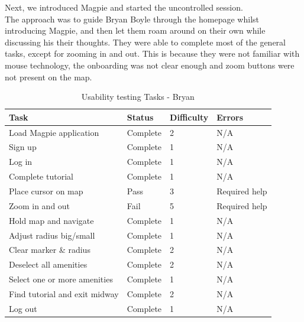 \noindent Next, we introduced Magpie and started the uncontrolled session.\\
The approach was to guide Bryan Boyle through the homepage whilst introducing Magpie, and then let them roam around on their own while discussing his their thoughts. They were able to complete most of the general tasks, except for zooming in and out. This is because they were not familiar with mouse technology, the onboarding was not clear enough and zoom buttons were not present on the map.
\begin{table}[h!]
    \centering
    \caption{Usability testing Tasks - Bryan}
    \begin{tabular}{|p{}|p{}|p{}|p{}|}
        \hline
        \textbf{Task}                 & \textbf{Status} & \textbf{Difficulty} & \textbf{Errors} \\
        \hline
        Load Magpie application       & Complete        & 2                   & N/A             \\
        \hline
        Sign up                       & Complete        & 1                   & N/A             \\
        \hline
        Log in                        & Complete        & 1                   & N/A             \\
        \hline
        Complete tutorial             & Complete        & 1                   & N/A             \\
        \hline
        Place cursor on map           & Pass            & 3                   & Required help   \\
        \hline
        Zoom in and out               & Fail            & 5                   & Required help   \\
        \hline
        Hold map and navigate         & Complete        & 1                   & N/A             \\
        \hline
        Adjust radius big/small       & Complete        & 1                   & N/A             \\
        \hline
        Clear marker \& radius        & Complete        & 2                   & N/A             \\
        \hline
        Deselect all amenities        & Complete        & 2                   & N/A             \\
        \hline
        Select one or more amenities  & Complete        & 1                   & N/A             \\
        \hline
        Find tutorial and exit midway & Complete        & 2                   & N/A             \\
        \hline
        Log out                       & Complete        & 1                   & N/A             \\
        \hline
    \end{tabular}
\end{table}\\
